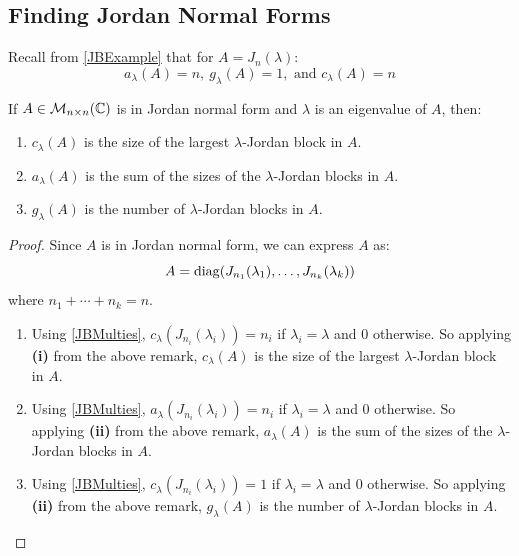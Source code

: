 \documentclass[../main.tex]{subfiles}
\begin{document}
\subsection{Finding Jordan Normal Forms}
\begin{remark}[Recap]
  Recall from \cref{JBExample} that for $A = J_{n}(\lambda)$:
  \begin{equation}
    a_{\lambda}(A) = n,\ g_{\lambda}(A) = 1, \text{ and } c_{\lambda}(A) = n \label{JBMultis}
  \end{equation}
\end{remark}
\begin{proposition}
  If $A \in \mathcal{M}_{n \times n}(\mathbb{C})$ is in Jordan normal form and $\lambda$ is an eigenvalue of $A$, then: \label{JNFSize}
  \begin{enumerate}
    \item $c_{\lambda}(A)$ is the size of the largest $\lambda$-Jordan block in $A$.
    \item $a_{\lambda}(A)$ is the sum of the sizes of the $\lambda$-Jordan blocks in $A$.
    \item $g_{\lambda}(A)$ is the number of $\lambda$-Jordan blocks in $A$.
  \end{enumerate}
\end{proposition}
\begin{proof}
  Since $A$ is in Jordan normal form, we can express $A$ as:
  \[
    A = \operatorname{diag}(J_{n_1}(\lambda_1), \ldots, J_{n_k}(\lambda_k))
  \]
  where $n_1 + \cdots + n_k = n$.
  \begin{enumerate}
    \item Using \cref{JBMulties}, $c_{\lambda}(J_{n_i}(\lambda_i)) = n_i$ if $\lambda_i = \lambda$ and 0 otherwise.
      So applying \textbf{(i)} from the above remark, $c_{\lambda}(A)$ is the size of the largest $\lambda$-Jordan block in $A$.
    \item Using \cref{JBMulties}, $a_{\lambda}(J_{n_i}(\lambda_i)) = n_i$ if $\lambda_i = \lambda$ and 0 otherwise.
      So applying \textbf{(ii)} from the above remark, $a_{\lambda}(A)$ is the sum of the sizes of the $\lambda$-Jordan blocks in $A$.
    \item Using \cref{JBMulties}, $c_{\lambda}(J_{n_i}(\lambda_i)) = 1$ if $\lambda_i = \lambda$ and 0 otherwise.
      So applying \textbf{(ii)} from the above remark, $g_{\lambda}(A)$ is the number of $\lambda$-Jordan blocks in $A$.
  \end{enumerate}
\end{proof}
\end{document}
